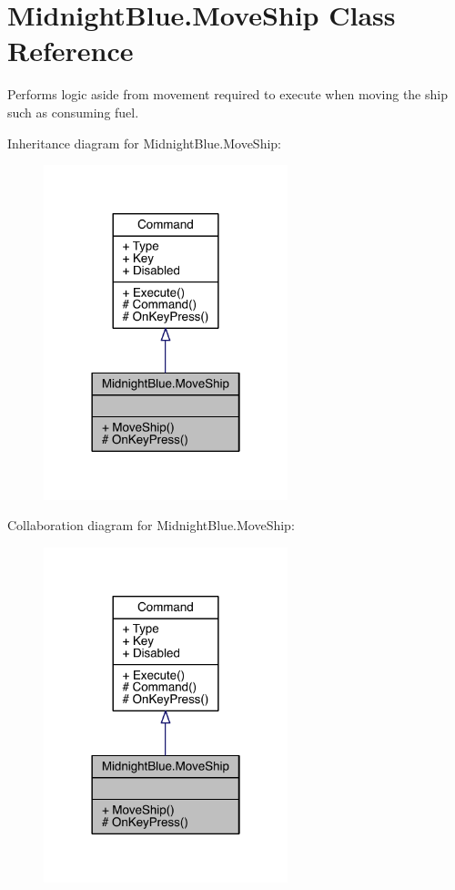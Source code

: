 \hypertarget{class_midnight_blue_1_1_move_ship}{}\section{Midnight\+Blue.\+Move\+Ship Class Reference}
\label{class_midnight_blue_1_1_move_ship}


Performs logic aside from movement required to execute when moving the ship such as consuming fuel.  




Inheritance diagram for Midnight\+Blue.\+Move\+Ship\+:\nopagebreak
\begin{figure}[H]
\begin{center}
\leavevmode
\includegraphics[width=201pt]{class_midnight_blue_1_1_move_ship__inherit__graph}
\end{center}
\end{figure}


Collaboration diagram for Midnight\+Blue.\+Move\+Ship\+:\nopagebreak
\begin{figure}[H]
\begin{center}
\leavevmode
\includegraphics[width=201pt]{class_midnight_blue_1_1_move_ship__coll__graph}
\end{center}
\end{figure}
